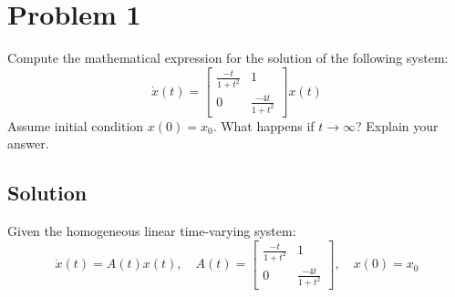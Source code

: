 \section*{Problem 1}

Compute the mathematical expression for the solution of the following system:
\begin{equation*}
    \dot x(t)
    =
    \begin{bmatrix}
        \frac{-t}{1+t^2} & 1                 \\
        0                & \frac{-4t}{1+t^2}
    \end{bmatrix}
    x(t)
\end{equation*}
Assume initial condition \( x(0) = x_0 \).
What happens if \( t \rightarrow \infty \)?
Explain your answer.

\subsection*{Solution}

Given the homogeneous linear time-varying system:
\begin{equation*}
    \dot{x}(t)
    =
    A(t) x(t),
    \quad
    A(t)
    =
    \begin{bmatrix}
        \frac{-t}{1+t^2} & 1                 \\
        0                & \frac{-4t}{1+t^2}
    \end{bmatrix},
    \quad
    x(0) = x_0
\end{equation*}

